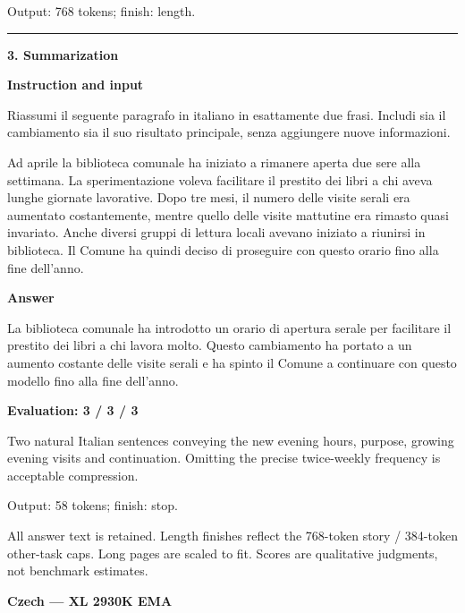 \documentclass[10pt]{article}
\begin{document}
{\begin{minipage}{\textwidth}
\par {\color{gray} Output: 768 tokens; finish: length.}\par
\medskip\hrule\smallskip
{\bfseries 3. Summarization}\par\smallskip
\textbf{Instruction and input}\par Riassumi il seguente paragrafo in italiano in esattamente due frasi. Includi sia il cambiamento sia il suo risultato principale, senza aggiungere nuove informazioni.
\par\smallskip
Ad aprile la biblioteca comunale ha iniziato a rimanere aperta due sere alla settimana. La sperimentazione voleva facilitare il prestito dei libri a chi aveva lunghe giornate lavorative. Dopo tre mesi, il numero delle visite serali era aumentato costantemente, mentre quello delle visite mattutine era rimasto quasi invariato. Anche diversi gruppi di lettura locali avevano iniziato a riunirsi in biblioteca. Il Comune ha quindi deciso di proseguire con questo orario fino alla fine dell'anno.\par\smallskip
\textbf{Answer}\par La biblioteca comunale ha introdotto un orario di apertura serale per facilitare il prestito dei libri a chi lavora molto. Questo cambiamento ha portato a un aumento costante delle visite serali e ha spinto il Comune a continuare con questo modello fino alla fine dell'anno.\par\smallskip
\textbf{Evaluation: 3 / 3 / 3}\par Two natural Italian sentences conveying the new evening hours, purpose, growing evening visits and continuation. Omitting the precise twice-weekly frequency is acceptable compression.
\par {\color{gray} Output: 58 tokens; finish: stop.}\par
\medskip\footnotesize All answer text is retained. Length finishes reflect the 768-token story / 384-token other-task caps. Long pages are scaled to fit. Scores are qualitative judgments, not benchmark estimates.
\end{minipage}}%
\noindent\ifdim\dimexpr\ht\languagepage+\dp\languagepage\relax>0.93\textheight%
\resizebox*{!}{0.93\textheight}{\usebox{\languagepage}}%
\else\usebox{\languagepage}\fi%
\clearpage
{\Large\bfseries Czech --- XL 2930K EMA}\par\smallskip
\end{document}
